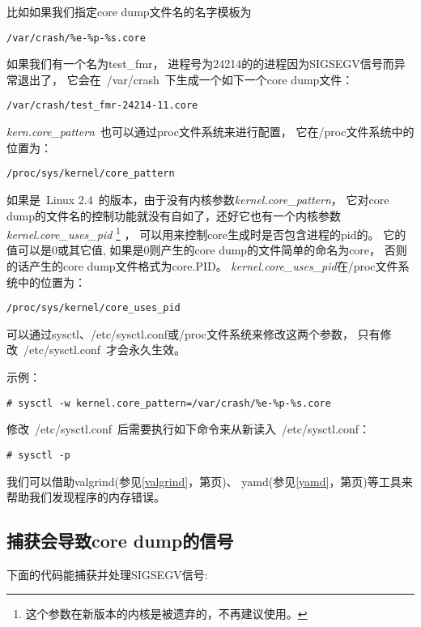 比如如果我们指定core dump文件名的名字模板为
\begin{lstlisting}
/var/crash/%e-%p-%s.core
\end{lstlisting}

如果我们有一个名为test\_fmr，
进程号为24214的的进程因为SIGSEGV信号而异常退出了，
它会在~/var/crash~下生成一个如下一个core dump文件：
\begin{lstlisting}
/var/crash/test_fmr-24214-11.core
\end{lstlisting}

\emph{kern.core\_pattern}~也可以通过proc文件系统来进行配置，
它在/proc文件系统中的位置为：
\begin{lstlisting}
/proc/sys/kernel/core_pattern
\end{lstlisting}

如果是~Linux 2.4~的版本，由于没有内核参数\emph{kernel.core\_pattern}，
它对core dump的文件名的控制功能就没有自如了，还好它也有一个内核参数
\emph{kernel.core\_uses\_pid}
\footnote{这个参数在新版本的内核是被遗弃的，不再建议使用。}
，
可以用来控制core生成时是否包含进程的pid的。
它的值可以是0或其它值,
如果是0则产生的core dump的文件简单的命名为core，
否则的话产生的core dump文件格式为core.PID。
\emph{kernel.core\_uses\_pid}在/proc文件系统中的位置为：
\begin{lstlisting}
/proc/sys/kernel/core_uses_pid
\end{lstlisting}

可以通过sysctl、/etc/sysctl.conf或/proc文件系统来修改这两个参数，
只有修改~/etc/sysctl.conf~才会永久生效。

示例：
\begin{lstlisting}
# sysctl -w kernel.core_pattern=/var/crash/%e-%p-%s.core
\end{lstlisting}

修改~/etc/sysctl.conf~后需要执行如下命令来从新读入~/etc/sysctl.conf：
\begin{lstlisting}
# sysctl -p
\end{lstlisting}

我们可以借助valgrind(参见\ref{valgrind}，第\pageref{valgrind}页)、
yamd(参见\ref{yamd}，第\pageref{yamd}页)等工具来帮助我们发现程序的内存错误。

\subsection{捕获会导致core dump的信号}

下面的代码能捕获并处理SIGSEGV信号:

